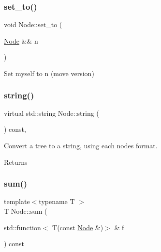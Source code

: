 \subsubsection{\texorpdfstring{set\+\_\+to()}{set\_to()}\hspace{0.1cm}{\footnotesize\ttfamily [2/2]}}
{\footnotesize\ttfamily void Node\+::set\+\_\+to (\begin{DoxyParamCaption}\item[{\hyperlink{class_node}{Node} \&\&}]{n }\end{DoxyParamCaption})\hspace{0.3cm}{\ttfamily [inline]}}

Set myself to n (move version)\mbox{\label{class_node_a0590ae269543416be9c4ebdf70bad73b}} 
\subsubsection{\texorpdfstring{string()}{string()}}
{\footnotesize\ttfamily virtual std\+::string Node\+::string (\begin{DoxyParamCaption}{ }\end{DoxyParamCaption}) const\hspace{0.3cm}{\ttfamily [inline]}, {\ttfamily [virtual]}}

Convert a tree to a string, using each node\textquotesingle{}s format. \begin{DoxyReturn}{Returns}

\end{DoxyReturn}
\mbox{\label{class_node_ac91282056a0df2835f1579bdd21c93e1}} 
\subsubsection{\texorpdfstring{sum()}{sum()}\hspace{0.1cm}{\footnotesize\ttfamily [1/2]}}
{\footnotesize\ttfamily template$<$typename T $>$ \\
T Node\+::sum (\begin{DoxyParamCaption}\item[{std\+::function$<$ T(const \hyperlink{class_node}{Node} \&)$>$ \&}]{f }\end{DoxyParamCaption}) const\hspace{0.3cm}{\ttfamily [inline]}}

